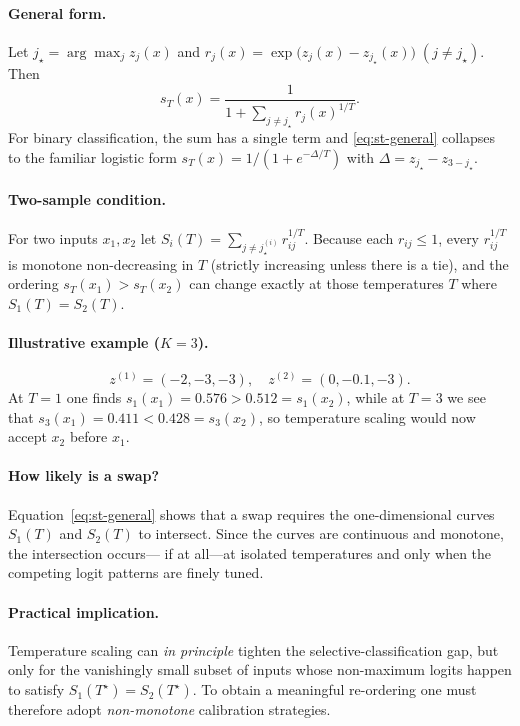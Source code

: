 \paragraph{General form.}
Let $j_\star=\arg\max_j z_j(x)$ and
$r_j(x)=\exp\bigl(z_j(x)-z_{j_\star}(x)\bigr)\;(j\ne j_\star)$.
Then
\begin{equation}
  s_T(x)=\frac{1}{1+\sum_{j\ne j_\star} r_j(x)^{1/T}}.
  \label{eq:st-general}
\end{equation}
For binary classification, the sum has a single term and
\eqref{eq:st-general} collapses to the familiar logistic form
$s_T(x)=1/(1+e^{-\Delta/T})$ with
$\Delta=z_{j_\star}-z_{3-j_\star}$.

\paragraph{Two-sample condition.}
For two inputs $x_1,x_2$ let
$S_i(T)=\sum_{j\ne j_\star^{(i)}}r_{ij}^{1/T}$.
Because each $r_{ij}\le 1$, every $r_{ij}^{1/T}$ is monotone non-decreasing in $T$ (strictly increasing unless there is a tie),
and the ordering $s_T(x_1)>s_T(x_2)$ can change
exactly at those temperatures $T$ where $S_1(T) = S_2(T)$.

\paragraph{Illustrative example ($K=3$).}
\begin{equation}
z^{(1)}=(-2,-3,-3),\quad z^{(2)}=(0,-0.1,-3).
\end{equation}
At $T=1$ one finds
$s_1(x_1)=0.576>0.512=s_1(x_2)$,
while at $T=3$ we see that
$s_3(x_1)=0.411<0.428=s_3(x_2)$,
so temperature scaling would now accept $x_2$ before $x_1$.

\paragraph{How likely is a swap?}
Equation~\eqref{eq:st-general} shows that a swap requires the
one-dimensional curves $S_1(T)$ and $S_2(T)$ to intersect.  Since the
curves are continuous and monotone, the intersection occurs—
if at all—at isolated temperatures and only when the competing logit
patterns are finely tuned.

\paragraph{Practical implication.}
Temperature scaling can \emph{in principle} tighten the
selective-classification gap, but only for the vanishingly small subset
of inputs whose non-maximum logits happen to satisfy
$S_1(T^\star)=S_2(T^\star)$.  To obtain a meaningful re-ordering one
must therefore adopt \emph{non-monotone} calibration strategies.


